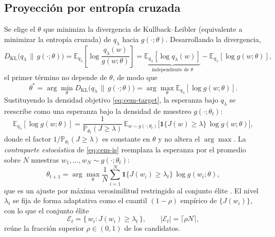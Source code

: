 \subsection{Proyección por entropía cruzada}
Se elige el $\theta$ que minimiza la divergencia de Kullback--Leibler (equivalente a
minimizar la entropía cruzada) de $q_{\lambda}$ hacia $g(\cdot; \theta)$. Desarrollando
la divergencia,
\begin{equation}
  D_{\mathrm{KL}}\!\big(q_{\lambda} \,\|\, g(\cdot; \theta)\big)
  = \mathbb{E}_{q_{\lambda}}\!\left[\log \frac{q_{\lambda}(w)}{g(w; \theta)}\right]
  = \underbrace{\mathbb{E}_{q_{\lambda}}\!\left[\log q_{\lambda}(w)\right]}_{\text{independiente de }\theta}
    - \mathbb{E}_{q_{\lambda}}\!\left[\log g(w; \theta)\right],
  \label{eq:cem-kl}
\end{equation}
el primer término no depende de $\theta$, de modo que
\begin{equation}
  \theta^{*}
  = \arg\min_{\theta} D_{\mathrm{KL}}\!\big(q_{\lambda} \,\|\, g(\cdot; \theta)\big)
  = \arg\max_{\theta} \mathbb{E}_{q_{\lambda}}\!\left[\log g(w; \theta)\right].
  \label{eq:cem-proj}
\end{equation}
Sustituyendo la densidad objetivo \eqref{eq:cem-target}, la esperanza bajo
$q_{\lambda}$ se reescribe como una esperanza bajo la densidad de muestreo
$g(\cdot; \theta_{t})$:
\begin{equation}
  \mathbb{E}_{q_{\lambda}}\!\left[\log g(w; \theta)\right]
  = \frac{1}{\mathbb{P}_{\theta_{t}}(J \ge \lambda)}\,
    \mathbb{E}_{w \sim g(\cdot; \theta_{t})}\!\big[\mathbf{1}\{J(w) \ge \lambda\}\,\log g(w; \theta)\big],
  \label{eq:cem-is}
\end{equation}
donde el factor $1/\mathbb{P}_{\theta_{t}}(J \ge \lambda)$ es constante en $\theta$ y
no altera el $\arg\max$. La \emph{contraparte estocástica} de \eqref{eq:cem-is}
reemplaza la esperanza por el promedio sobre $N$ muestras
$w_{1}, \dots, w_{N} \sim g(\cdot; \theta_{t})$:
\begin{equation}
  \theta_{t+1}
  = \arg\max_{\theta} \frac{1}{N} \sum_{i=1}^{N}
    \mathbf{1}\{J(w_{i}) \ge \lambda_{t}\}\, \log g(w_{i}; \theta),
  \label{eq:cem-stoch}
\end{equation}
que es un ajuste por máxima verosimilitud restringido al conjunto élite
\citep{deboer2005}. El nivel $\lambda_{t}$ se fija de forma adaptativa como el cuantil
$(1-\rho)$ empírico de $\{J(w_{i})\}$, con lo que el conjunto élite
\begin{equation}
  \mathcal{E}_{t} = \{\, w_{i} : J(w_{i}) \ge \lambda_{t} \,\},
  \qquad |\mathcal{E}_{t}| = \lceil \rho N \rceil,
  \label{eq:cem-elite}
\end{equation}
reúne la fracción superior $\rho \in (0,1)$ de los candidatos.

